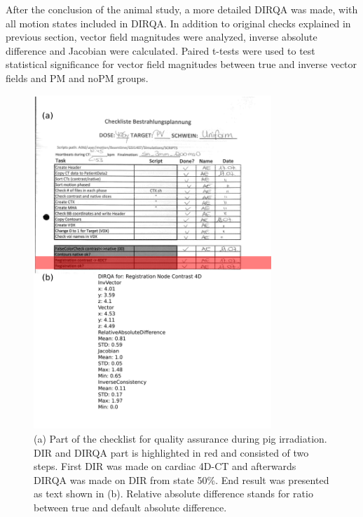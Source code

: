 After the conclusion of the animal study, a more detailed DIRQA was made, with all motion states included in DIRQA. In addition to original checks explained in previous section, vector field magnitudes were analyzed, inverse absolute difference
and Jacobian were calculated. Paired t-tests were used to test statistical significance for vector field magnitudes between true and inverse vector fields and PM and noPM groups.

\newpage
\begin{figure}[H]
	\begin{center}		
		\includegraphics[width=0.8\textwidth]{./Vmm/Images/checkList.png}
		\caption{(a) Part of the checklist for quality assurance during pig irradiation. DIR and DIRQA part is highlighted in red and consisted of two steps. First DIR was made on cardiac 4D-CT and afterwards DIRQA was made on
		DIR from state 50\%. End result was presented as text shown in (b). Relative absolute difference stands for ratio between true and default absolute difference.}
		\label{checkList}
	\end{center}
\end{figure}
\newpage

